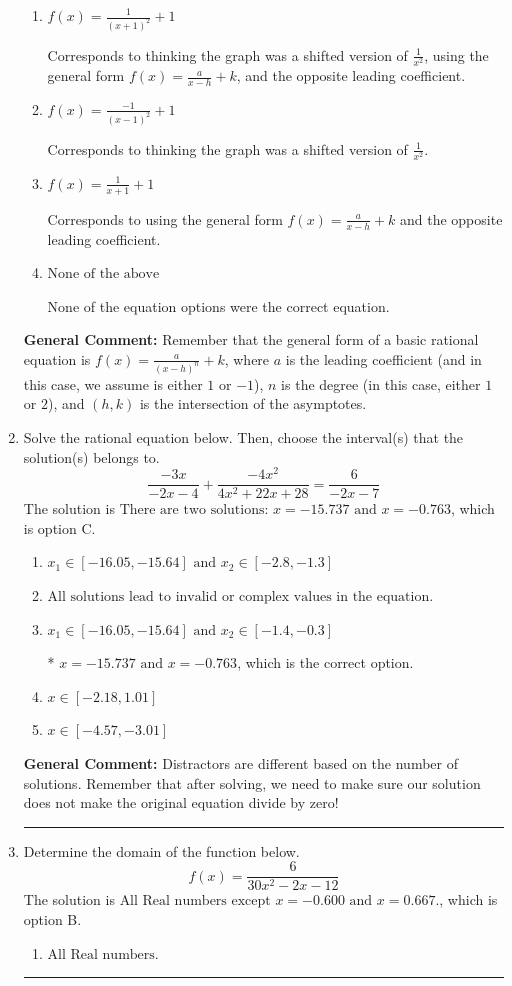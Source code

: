 \documentclass{extbook}[14pt]
\newcommand{\litem}[1]{\item #1

\rule{\textwidth}{0.4pt}}
\begin{document}
\begin{enumerate}
{\begin{enumerate}[label=\Alph*.]
The $x$-value of the equation does not match the graph.
\item \( f(x) = \frac{1}{(x + 1)^2} + 1 \)

Corresponds to thinking the graph was a shifted version of $\frac{1}{x^2}$, using the general form $f(x) = \frac{a}{x-h}+k$, and the opposite leading coefficient.
\item \( f(x) = \frac{-1}{(x - 1)^2} + 1 \)

Corresponds to thinking the graph was a shifted version of $\frac{1}{x^2}$.
\item \( f(x) = \frac{1}{x + 1} + 1 \)

Corresponds to using the general form $f(x) = \frac{a}{x-h}+k$ and the opposite leading coefficient.
\item \( \text{None of the above} \)

None of the equation options were the correct equation.
\end{enumerate}

\textbf{General Comment:} Remember that the general form of a basic rational equation is $ f(x) = \frac{a}{(x-h)^n} + k$, where $a$ is the leading coefficient (and in this case, we assume is either $1$ or $-1$), $n$ is the degree (in this case, either $1$ or $2$), and $(h, k)$ is the intersection of the asymptotes.
}
\litem{
Solve the rational equation below. Then, choose the interval(s) that the solution(s) belongs to.
\[ \frac{-3x}{-2x -4} + \frac{-4x^{2}}{4x^{2} +22 x + 28} = \frac{6}{-2x -7} \]The solution is \( \text{There are two solutions: } x = -15.737 \text{ and } x = -0.763 \), which is option C.\begin{enumerate}[label=\Alph*.]
\item \( x_1 \in [-16.05, -15.64] \text{ and } x_2 \in [-2.8,-1.3] \)


\item \( \text{All solutions lead to invalid or complex values in the equation.} \)


\item \( x_1 \in [-16.05, -15.64] \text{ and } x_2 \in [-1.4,-0.3] \)

* $x = -15.737 \text{ and } x = -0.763$, which is the correct option.
\item \( x \in [-2.18,1.01] \)


\item \( x \in [-4.57,-3.01] \)


\end{enumerate}

\textbf{General Comment:} Distractors are different based on the number of solutions. Remember that after solving, we need to make sure our solution does not make the original equation divide by zero!
}
\litem{
Determine the domain of the function below.
\[ f(x) = \frac{6}{30x^{2} -2 x -12} \]The solution is \( \text{All Real numbers except } x = -0.600 \text{ and } x = 0.667. \), which is option B.\begin{enumerate}[label=\Alph*.]
\item \( \text{All Real numbers.} \)


\end{enumerate}}
\end{enumerate}
\end{document}
